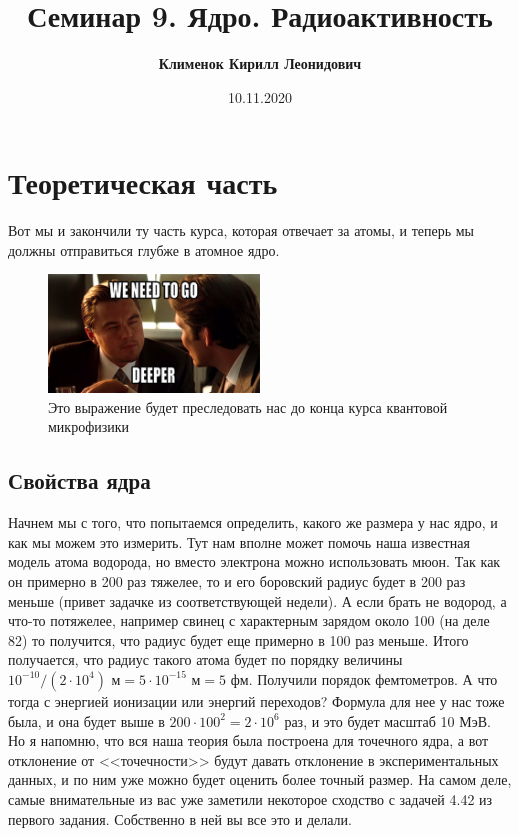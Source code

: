 \documentclass[12pt]{article}
\begin{document}
 
\title{\textbf{Семинар 9. Ядро. Радиоактивность }}
\author{\textbf{Клименок Кирилл Леонидович}}
\date{10.11.2020}
\maketitle
\section{Теоретическая часть}
Вот мы и закончили ту часть курса, которая отвечает за атомы, и теперь мы должны отправиться глубже в атомное ядро.
\begin{figure}[h]
    \centering
    \includegraphics[width=0.5\textwidth,height=\textheight,keepaspectratio]{Seminar_09/pics/pic_deeper.jpg}
    \caption{Это выражение будет преследовать нас до конца курса квантовой микрофизики}
\end{figure}
\subsection{Свойства ядра}

Начнем мы с того, что попытаемся определить, какого же размера у нас ядро, и как мы можем это измерить. Тут нам вполне может помочь наша известная модель атома водорода, но вместо электрона можно использовать мюон. Так как он примерно в 200 раз тяжелее, то и его боровский радиус будет в 200 раз меньше (привет задачке из соответствующей недели). А если брать не водород, а что-то потяжелее, например свинец с характерным зарядом около 100 (на деле 82) то получится, что радиус будет еще примерно в 100 раз меньше. Итого получается, что радиус такого атома будет по порядку величины $10^{-10}/(2\cdot 10^{4}) \text{ м} =5\cdot 10^{-15} \text{ м} = 5 \text{ фм}$. Получили порядок фемтометров. А что тогда с энергией ионизации или энергий переходов? Формула для нее у нас тоже была, и она будет выше в $200\cdot 100^2 = 2\cdot 10^6$ раз, и это будет масштаб 10 МэВ. Но я напомню, что вся наша теория была построена для точечного ядра, а вот отклонение от <<точечности>> будут давать отклонение в экспериментальных данных, и по ним уже можно будет оценить более точный размер. На самом деле, самые внимательные из вас уже заметили некоторое сходство с задачей 4.42 из первого задания. Собственно в ней вы все это и делали. 
\end{document}
